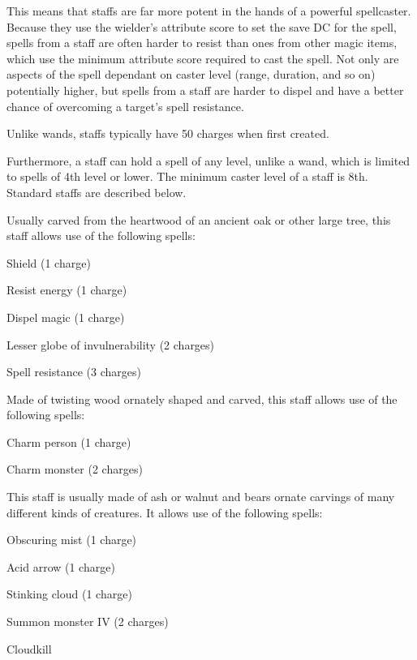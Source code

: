 This means that staffs are far more potent in the hands of a powerful spellcaster. Because they use the wielder's attribute score to set the save DC for the spell, spells from a staff are often harder to resist than ones from other magic items, which use the minimum attribute score required to cast the spell. Not only are aspects of the spell dependant on caster level (range, duration, and so on) potentially higher, but spells from a staff are harder to dispel and have a better chance of overcoming a target's spell resistance.

Unlike wands, staffs typically have 50 charges when first created.

Furthermore, a staff can hold a spell of any level, unlike a wand, which is limited to spells of 4th level or lower. The minimum caster level of a staff is 8th. Standard staffs are described below.

 Usually carved from the heartwood of an ancient oak or other large tree, this staff allows use of the following spells:
\begin{itemize*}
\item Shield (1 charge)
\item Resist energy (1 charge)
\item Dispel magic (1 charge)
\item Lesser globe of invulnerability (2 charges)
\item Spell resistance (3 charges)
\end{itemize*}


 Made of twisting wood ornately shaped and carved, this staff allows use of the following spells:
\begin{itemize*}
\item Charm person (1 charge)
\item Charm monster (2 charges)
\end{itemize*}


 This staff is usually made of ash or walnut and bears ornate carvings of many different kinds of creatures. It allows use of the following spells:
\begin{itemize*}
\item Obscuring mist (1 charge)
\item Acid arrow (1 charge)
\item Stinking cloud (1 charge)
\item Summon monster IV (2 charges)
\item Cloudkill 
\end{itemize*}

